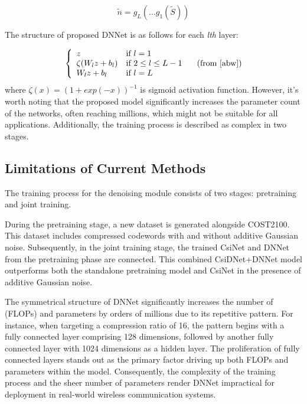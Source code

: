 \documentclass[lettersize,journal]{IEEEtran}
\begin{document}
\begin{equation}
		\tilde{n}=g_{L}(...g_{1}(\tilde{S})) 
\end{equation}

The structure of proposed DNNet is as follows for each \textit{lth} 
layer:

\begin{equation}
\left\{
\begin{array}{ll}
	z  & \mbox{if } l=1 \\
	\zeta(W_{l}z+b_{l}) & \mbox{if } 2\le l \le L-1  \\
	W_{l}z+b_{l} & \mbox{if } l=L  
\end{array} 
\right.
	\label{eqn:dnnfunction}
	 \quad (\text{from \cite{abw}})
\end{equation}
where \begin{math}  \zeta(x)=(1+exp(-x))^{-1} \end{math} is sigmoid activation function.
However, it's worth noting that the proposed model significantly increases the parameter count of the networks, often reaching millions, which might not be suitable for all applications. Additionally, the training process is described as complex in two stages.
\subsection{Limitations of Current Methods}
The training process for the denoising module consists of two stages: pretraining and joint training.

During the pretraining stage, a new dataset is generated alongside COST2100. This dataset includes compressed codewords with and without additive Gaussian noise. Subsequently, in the joint training stage, the trained CsiNet and DNNet from the pretraining phase are connected. This combined CsiDNet+DNNet model outperforms both the standalone pretraining model and CsiNet in the presence of additive Gaussian noise. 

The symmetrical structure of DNNet significantly increases the number of (FLOPs) and parameters by orders of millions due to its repetitive pattern. For instance, when targeting a compression ratio of 16, the pattern begins with a fully connected layer comprising 128 dimensions, followed by another fully connected layer with 1024 dimensions as a hidden layer. The proliferation of fully connected layers stands out as the primary factor driving up both FLOPs and parameters within the model. Consequently, the complexity of the training process and the sheer number of parameters render DNNet impractical for deployment in real-world wireless communication systems.
\end{document}

